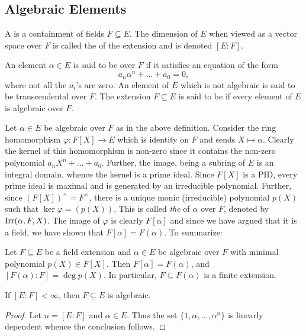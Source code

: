\subsection{Algebraic Elements}

\begin{definition}
    A  is a containment of fields $F\subseteq E$. The dimension of $E$ when viewed as a vector space over $F$ is called the  of the extension and is denoted $[E : F]$.
    
    An element $\alpha\in E$ is said to be  over $F$ if it satisfies an equation of the form 
    \begin{equation*}
        a_n\alpha^n + \dots + a_0 = 0,
    \end{equation*}
    where not all the $a_i$'s are zero. An element of $E$ which is not algebraic is said to be transcendental over $F$. The extension $F\subseteq E$ is said to be  if every element of $E$ is algebraic over $F$.
\end{definition}

Let $\alpha\in E$ be algebraic over $F$ as in the above definition. Consider the ring homomorphism $\varphi\colon F[X]\to E$ which is identity on $F$ and sends $X\mapsto\alpha$. Clearly the kernel of this homomorphism is non-zero since it contains the non-zero polynomial $a_nX^n + \dots + a_0$. Further, the image, being a subring of $E$ is an integral domain, whence the kernel is a prime ideal. Since $F[X]$ is a PID, every prime ideal is maximal and is generated by an irreducible polynomial. Further, since $\left(F[X]\right)^\times = F^\times$, there is a unique monic (irreducible) polynomial $p(X)$ such that $\ker\varphi = \left(p(X)\right)$. This is called \emph{the}  of $\alpha$ over $F$, denoted by $\operatorname{Irr}(\alpha, F, X)$. The image of $\varphi$ is clearly $F[\alpha]$ and since we have argued that it is a field, we have shown that $F[\alpha] = F(\alpha)$. To summarize: 
\begin{proposition}
    Let $F\subseteq E$ be a field extension and $\alpha\in E$ be algebraic over $F$ with minimal polynomial $p(X)\in F[X]$. Then $F[\alpha] = F(\alpha)$, and $[F(\alpha) : F] = \deg p(X)$. In particular, $F\subseteq F(\alpha)$ is a finite extension.
\end{proposition}

\begin{proposition}
    If $[E : F] < \infty$, then $F\subseteq E$ is algebraic.
\end{proposition}
\begin{proof}
    Let $n = [E : F]$ and $\alpha\in E$. Thus the set $\{1, \alpha, \dots, \alpha^n\}$ is linearly dependent whence the conclusion follows.
\end{proof}

